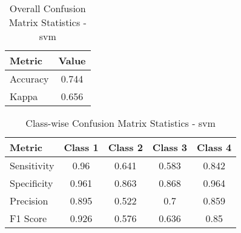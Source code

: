 \begin{table}[h]
\centering
\begin{tabular}{l|c}
Metric & Value \\ \hline
Accuracy & 0.744 \\
Kappa & 0.656 \\
\end{tabular}
\caption{Overall Confusion Matrix Statistics - svm }
\end{table}

\begin{table}[h]
\centering
\begin{tabular}{l|c|c|c|c}
Metric & Class 1 & Class 2 & Class 3 & Class 4 \\ \hline
Sensitivity & 0.96 & 0.641 & 0.583 & 0.842 \\
Specificity & 0.961 & 0.863 & 0.868 & 0.964 \\
Precision & 0.895 & 0.522 & 0.7 & 0.859 \\
F1 Score & 0.926 & 0.576 & 0.636 & 0.85 \\
\end{tabular}
\caption{Class-wise Confusion Matrix Statistics - svm }
\end{table}
